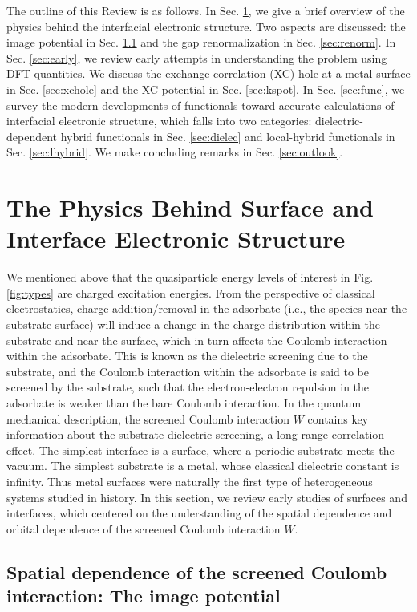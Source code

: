 \documentclass[aip, amsmath, amssymb, reprint, longbibliography]{revtex4-2}
\begin{document}
The outline of this Review is as follows. In Sec. \ref{sec:physics}, we give a brief overview of the physics behind the interfacial electronic structure. Two aspects are discussed: the image potential in Sec. \ref{sec:image} and the gap renormalization in Sec. \ref{sec:renorm}. In Sec. \ref{sec:early}, we review early attempts in understanding the problem using DFT quantities. We discuss the exchange-correlation (XC) hole at a metal surface in Sec. \ref{sec:xchole} and the XC potential in Sec. \ref{sec:kspot}. In Sec. \ref{sec:func}, we survey the modern developments of functionals toward accurate calculations of interfacial electronic structure, which falls into two categories: dielectric-dependent hybrid functionals in Sec. \ref{sec:dielec} and local-hybrid functionals in Sec. \ref{sec:lhybrid}. We make concluding remarks in Sec. \ref{sec:outlook}.

\section{The Physics Behind Surface and Interface Electronic Structure}
\label{sec:physics}
We mentioned above that the quasiparticle energy levels of interest in Fig. \ref{fig:types} are charged excitation energies. From the perspective of classical electrostatics, charge addition/removal in the adsorbate (i.e., the species near the substrate surface) will induce a change in the charge distribution within the substrate and near the surface, which in turn affects the Coulomb interaction within the adsorbate. This is known as the dielectric screening due to the substrate, and the Coulomb interaction within the adsorbate is said to be screened by the substrate, such that the electron-electron repulsion in the adsorbate is weaker than the bare Coulomb interaction. In the quantum mechanical description, the screened Coulomb interaction $W$ contains key information about the substrate dielectric screening, a long-range correlation effect. The simplest interface is a surface, where a periodic substrate meets the vacuum. The simplest substrate is a metal, whose classical dielectric constant is infinity. Thus metal surfaces were naturally the first type of heterogeneous systems studied in history. In this section, we review early studies of surfaces and interfaces, which centered on the understanding of the spatial dependence and orbital dependence of the screened Coulomb interaction $W$.

\subsection{Spatial dependence of the screened Coulomb interaction: The image potential}
\label{sec:image}
\end{document}
